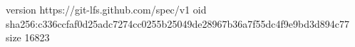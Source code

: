 version https://git-lfs.github.com/spec/v1
oid sha256:c336ccfaf0d25adc7274cc0255b25049de28967b36a7f55dc4f9e9bd3d894c77
size 16823
